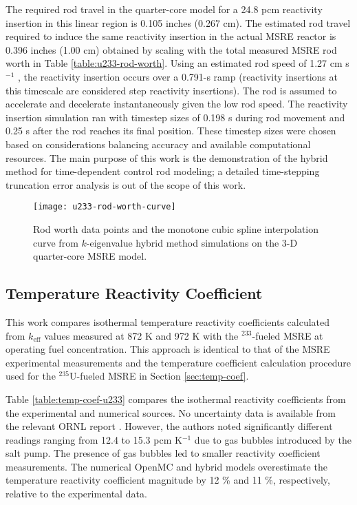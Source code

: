 The required
rod travel in the quarter-core model for a 24.8 pcm reactivity insertion in this linear region
is 0.105 inches (0.267 cm). The estimated rod travel required to induce the same reactivity
insertion in the actual \gls{MSRE} reactor is 0.396 inches (1.00 cm) obtained by scaling with the
total measured \gls{MSRE} rod worth in Table \ref{table:u233-rod-worth}. Using
an estimated rod speed of 1.27 cm s$^{-1}$ \cite{robertson_msre_1965}, the reactivity insertion
occurs over a 0.791-s ramp (reactivity insertions at this timescale are considered step reactivity
insertions). The rod is assumed to accelerate and decelerate instantaneously given
the low rod speed.
The reactivity insertion simulation ran with timestep sizes of 0.198 s during rod movement and
0.25 s after the rod reaches its final position. These timestep sizes were chosen based on
considerations balancing accuracy and available computational resources. The main purpose of this
work is the demonstration of the hybrid method for time-dependent control rod modeling; a detailed
time-stepping truncation error analysis is out of the scope of this work.

\begin{figure}[t]
  \centering
  \texttt{[image: u233-rod-worth-curve]}
  \caption{Rod worth data points and the monotone cubic spline interpolation curve from $k$-eigenvalue
  hybrid method simulations on the 3-D quarter-core \gls{MSRE} model.}
  \label{fig:u233-rod-worth-curve}
\end{figure}

\subsection{Temperature Reactivity Coefficient}

This work compares isothermal temperature reactivity coefficients calculated from $k_\text{eff}$
values measured at 872 K and 972 K with the $^{233}$-fueled \gls{MSRE} at operating fuel
concentration. This approach is identical to that
of the \gls{MSRE} experimental measurements \cite{engel_zero-power_1972} and the temperature
coefficient calculation procedure used for the $^{235}$U-fueled \gls{MSRE} in Section
\ref{sec:temp-coef}.

Table \ref{table:temp-coef-u233} compares the isothermal reactivity coefficients from the experimental
and numerical sources. No uncertainty data is available from the relevant \gls{ORNL} report
\cite{engel_zero-power_1972}. However, the authors noted significantly different readings ranging
from 12.4 to 15.3 pcm K$^{-1}$ due to gas bubbles introduced by the salt pump. The
presence of gas bubbles led to smaller reactivity coefficient measurements. The numerical OpenMC
and hybrid models overestimate the temperature reactivity coefficient magnitude by 12 \% and 11 \%,
respectively, relative to the experimental data.

